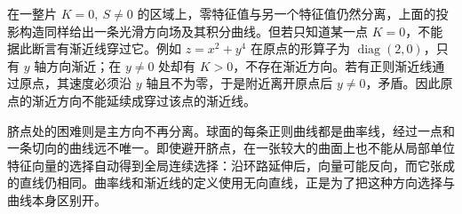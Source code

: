 在一整片 \(K=0,\ S\ne0\) 的区域上，零特征值与另一个特征值仍然分离，上面的投影构造同样给出一条光滑方向场及其积分曲线。但若只知道某一点 \(K=0\)，不能据此断言有渐近线穿过它。例如 \(z=x^2+y^4\) 在原点的形算子为 \(\operatorname{diag}(2,0)\)，只有 \(y\) 轴方向渐近；在 \(y\ne0\) 处却有 \(K>0\)，不存在渐近方向。若有正则渐近线通过原点，其速度必须沿 \(y\) 轴且不为零，于是附近离开原点后 \(y\ne0\)，矛盾。因此原点的渐近方向不能延续成穿过该点的渐近线。

\ProseParagraphBreak

脐点处的困难则是主方向不再分离。球面的每条正则曲线都是曲率线，经过一点和一条切向的曲线远不唯一。即使避开脐点，在一张较大的曲面上也不能从局部单位特征向量的选择自动得到全局连续选择：沿环路延伸后，向量可能反向，而它张成的直线仍相同。曲率线和渐近线的定义使用无向直线，正是为了把这种方向选择与曲线本身区别开。
